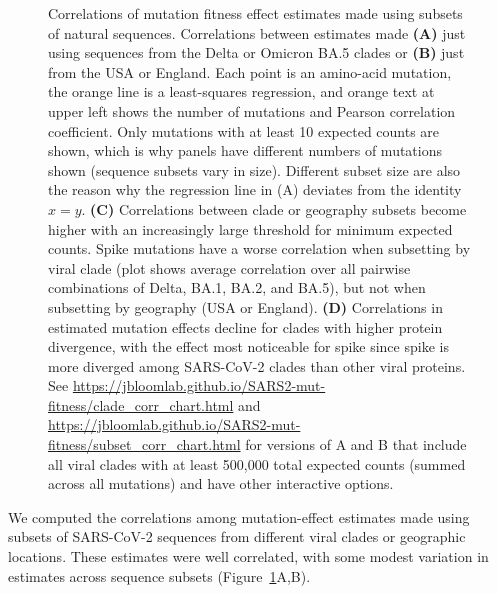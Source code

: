 \documentclass[9pt,twocolumn,twoside]{gsajnl_modified}
\begin{document}
\begin{figure}
\centering
\caption{
Correlations of mutation fitness effect estimates made using subsets of natural sequences.
Correlations between estimates made {\bf (A)} just using sequences from the Delta or Omicron BA.5 clades or {\bf (B)} just from the USA or England.
Each point is an amino-acid mutation, the orange line is a least-squares regression, and orange text at upper left shows the number of mutations and Pearson correlation coefficient.
Only mutations with at least 10 expected counts are shown, which is why panels have different numbers of mutations shown (sequence subsets vary in size).
Different subset size are also the reason why the regression line in (A) deviates from the identity $x=y$.
{\bf (C)} Correlations between clade or geography subsets become higher with an increasingly large threshold for minimum expected counts.
Spike mutations have a worse correlation when subsetting by viral clade (plot shows average correlation over all pairwise combinations of Delta, BA.1, BA.2, and BA.5), but not when subsetting by geography (USA or England).
{\bf (D)} Correlations in estimated mutation effects decline for clades with higher protein divergence, with the effect most noticeable for spike since spike is more diverged among SARS-CoV-2 clades than other viral proteins.
See \url{https://jbloomlab.github.io/SARS2-mut-fitness/clade_corr_chart.html} and \url{https://jbloomlab.github.io/SARS2-mut-fitness/subset_corr_chart.html} for versions of A and B that include all viral clades with at least 500,000 total expected counts (summed across all mutations) and have other interactive options.
\label{fig:corr}
}
\end{figure}

We computed the correlations among mutation-effect estimates made using subsets of SARS-CoV-2 sequences from different viral clades or geographic locations.
These estimates were well correlated, with some modest variation in estimates across sequence subsets (Figure~\ref{fig:corr}A,B).
\end{document}
